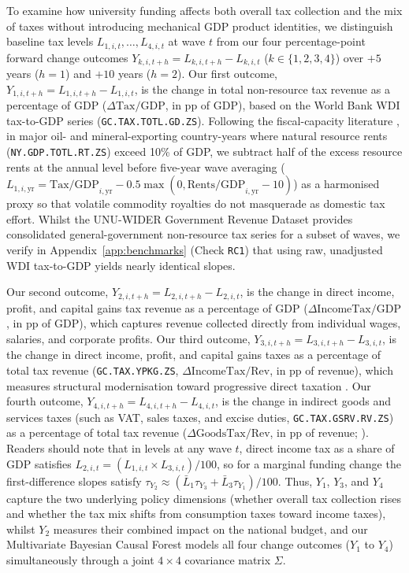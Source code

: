 \documentclass[11pt,a4paper]{article}
\begin{document}
To examine how university funding affects both overall tax collection and the mix of taxes without introducing mechanical GDP product identities, we distinguish baseline tax levels $L_{1,i,t}, \dots, L_{4,i,t}$ at wave $t$ from our four percentage-point forward change outcomes $Y_{k,i,t+h} = L_{k,i,t+h} - L_{k,i,t}$ ($k \in \{1, 2, 3, 4\}$) over $+5$ years ($h=1$) and $+10$ years ($h=2$). Our first outcome, $Y_{1,i,t+h} = L_{1,i,t+h} - L_{1,i,t}$, is the change in total non-resource tax revenue as a percentage of GDP ($\Delta \text{Tax/GDP}$, in pp of GDP), based on the World Bank WDI tax-to-GDP series (\texttt{GC.TAX.TOTL.GD.ZS}). Following the fiscal-capacity literature \citep{prichard2016reassessing, ictd2023grdv}, in major oil- and mineral-exporting country-years where natural resource rents (\texttt{NY.GDP.TOTL.RT.ZS}) exceed 10\% of GDP, we subtract half of the excess resource rents at the annual level before five-year wave averaging ($L_{1,i,\text{yr}} = \text{Tax/GDP}_{i,\text{yr}} - 0.5 \max(0, \text{Rents/GDP}_{i,\text{yr}} - 10)$) as a harmonised proxy so that volatile commodity royalties do not masquerade as domestic tax effort. Whilst the UNU-WIDER Government Revenue Dataset provides consolidated general-government non-resource tax series for a subset of waves, we verify in Appendix~\ref{app:benchmarks} (Check \texttt{RC1}) that using raw, unadjusted WDI tax-to-GDP yields nearly identical slopes.

Our second outcome, $Y_{2,i,t+h} = L_{2,i,t+h} - L_{2,i,t}$, is the change in direct income, profit, and capital gains tax revenue as a percentage of GDP ($\Delta \text{IncomeTax/GDP}$, in pp of GDP), which captures revenue collected directly from individual wages, salaries, and corporate profits. Our third outcome, $Y_{3,i,t+h} = L_{3,i,t+h} - L_{3,i,t}$, is the change in direct income, profit, and capital gains taxes as a percentage of total tax revenue (\texttt{GC.TAX.YPKG.ZS}, $\Delta \text{IncomeTax/Rev}$, in pp of revenue), which measures structural modernisation toward progressive direct taxation \citep{besley2014pillars, jensen2022employment}. Our fourth outcome, $Y_{4,i,t+h} = L_{4,i,t+h} - L_{4,i,t}$, is the change in indirect goods and services taxes (such as VAT, sales taxes, and excise duties, \texttt{GC.TAX.GSRV.RV.ZS}) as a percentage of total tax revenue ($\Delta \text{GoodsTax/Rev}$, in pp of revenue; \citealt{bachas2024informality}). Readers should note that in levels at any wave $t$, direct income tax as a share of GDP satisfies $L_{2,i,t} = (L_{1,i,t} \times L_{3,i,t}) / 100$, so for a marginal funding change the first-difference slopes satisfy $\tau_{Y_2} \approx (\bar{L}_1 \tau_{Y_3} + \bar{L}_3 \tau_{Y_1}) / 100$. Thus, $Y_1$, $Y_3$, and $Y_4$ capture the two underlying policy dimensions (whether overall tax collection rises and whether the tax mix shifts from consumption taxes toward income taxes), whilst $Y_2$ measures their combined impact on the national budget, and our Multivariate Bayesian Causal Forest models all four change outcomes ($Y_1$ to $Y_4$) simultaneously through a joint $4 \times 4$ covariance matrix $\Sigma$.
\end{document}
